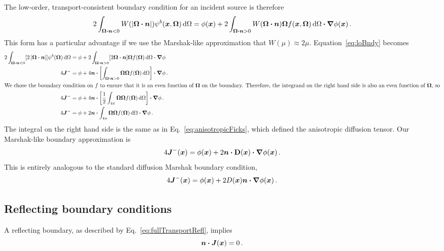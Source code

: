 The low-order, transport-consistent boundary condition for an incident source
is therefore
\begin{equation}\label{eq:loBndy}
  2\int_{\bm{\Omega}\bm{\cdot} \bm{n} < 0}
  W(\left| \bm{\Omega} \bm{\cdot} \bm{n} \right|) \psi^b(\bm{x}, \bm{\Omega}) \mathop{}\!\mathrm{d}\Omega
  = \phi(\bm{x})
  + 2\int_{\bm{\Omega}\bm{\cdot} \bm{n} > 0} W(\bm{\Omega} \bm{\cdot} \bm{n})
  \bm{\Omega} f(\bm{x}, \bm{\Omega}) \mathop{}\!\mathrm{d}\Omega
  \bm{\cdot} \bm{\nabla} \phi(\bm{x}) \,.
\end{equation}
This form has a particular advantage if we use the Marshak-like approximation
that $W(\mu)\approx 2\mu$. Equation~\eqref{eq:loBndy} becomes
\begin{align*}
  2\int_{\bm{\Omega}\bm{\cdot} \bm{n} < 0}
  [2\left| \bm{\Omega} \bm{\cdot} \bm{n} \right|] \psi^b(\bm{\Omega}) \mathop{}\!\mathrm{d}\Omega
  &= \phi
  + 2\int_{\bm{\Omega}\bm{\cdot} \bm{n} > 0} [2\bm{\Omega} \bm{\cdot} \bm{n}]
  \bm{\Omega} f(\bm{\Omega}) \mathop{}\!\mathrm{d}\Omega \bm{\cdot} \bm{\nabla} \phi
  \\
  4 \bm{J}^-
  &= \phi
  + 4 \bm{n} \bm{\cdot} \left[ \int_{\bm{\Omega}\bm{\cdot} \bm{n} > 0} \bm{\Omega}
  \bm{\Omega} f(\bm{\Omega}) \mathop{}\!\mathrm{d}\Omega \right] \bm{\cdot} \bm{\nabla} \phi \,.
  \\ 
  \intertext{We chose the boundary condition on $f$ to ensure that it is an
  even function of $\bm{\Omega}$ on the boundary. Therefore, the integrand on
  the right hand side is also an even function of $\bm{\Omega}$, so}
  4 \bm{J}^-
  &= \phi
  + 4 \bm{n} \bm{\cdot}  \left[ \frac{1}{2} \int_{4\pi}
  \bm{\Omega} \bm{\Omega} f(\bm{\Omega}) \mathop{}\!\mathrm{d}\Omega \right] \bm{\cdot} \bm{\nabla} \phi \,.
  \\
  4 \bm{J}^-
  &= \phi
  + 2 \bm{n} \bm{\cdot} \int_{4\pi}
  \bm{\Omega} \bm{\Omega} f(\bm{\Omega}) \mathop{}\!\mathrm{d}\Omega \bm{\cdot} \bm{\nabla} \phi \,.
\end{align*}
The integral on the right hand side is the same as in
  Eq.~\eqref{eq:anisotropicFicks}, which defined the anisotropic diffusion
  tensor. Our Marshak-like boundary approximation is
\begin{equation}\label{eq:marshakAd}
  4 \bm{J}^-(\bm{x})
  = \phi(\bm{x})
  + 2 \bm{n} \bm{\cdot} \mathbf{D}(\bm{x}) \bm{\cdot} \bm{\nabla} \phi(\bm{x}) \,.
\end{equation}
This is entirely analogous to the standard diffusion Marshak boundary condition,
\begin{equation*}
  4 \bm{J}^-(\bm{x}) = \phi(\bm{x}) + 2  D(\bm{x}) \bm{n} \bm{\cdot} \bm{\nabla} \phi(\bm{x})\,.
\end{equation*}

\subsection{Reflecting boundary conditions}
A reflecting boundary, as described by Eq.~\eqref{eq:fullTransportRefl}, 
implies
\begin{equation}\label{eq:reflFirst}
  \bm{n} \bm{\cdot} \bm{J}(\bm{x}) = 0\,.
\end{equation}

